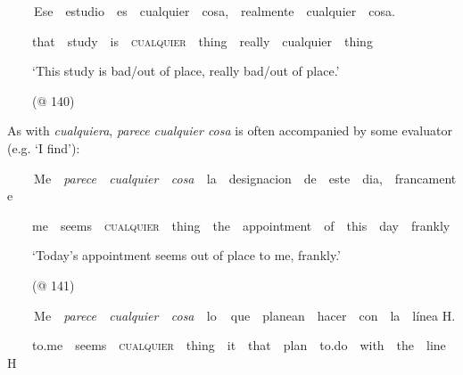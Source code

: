 \begin{styleStandard}
\textbf{\ \ }\ \ Ese\ \ estudio\ \ es\ \ cualquier\ \ cosa,\ \ realmente\ \ cualquier\ \ cosa.
\end{styleStandard}

\begin{styleStandard}
\ \ \ \ that\ \ study\ \ is\ \ \textsc{cualquier\ \ }thing\ \ really\ \ cualquier\ \ thing
\end{styleStandard}

\begin{styleStandard}
\ \ \ \ ‘This study is bad/out of place, really bad/out of place.’
\end{styleStandard}

\begin{styleStandard}
\ \ \ \ (@ 140)
\end{styleStandard}

\begin{styleStandard}
As with \textit{cualquiera}, \textit{parece cualquier cosa} is often accompanied by some evaluator (e.g. ‘I find’):
\end{styleStandard}

\begin{styleStandard}
\textbf{\ \ }\ \ Me\ \ \textit{parece\ \ cualquier\ \ cosa\ \ }la\ \ designacion\ \ de\ \ este\ \ dia,\ \ francamente
\end{styleStandard}

\begin{styleStandard}
\ \ \ \ me\ \ seems\ \ \textsc{cualquier}\ \ thing\ \ the\ \ appointment\ \ of\ \ this\ \ day\ \ frankly
\end{styleStandard}

\begin{styleStandard}
\ \ \ \ ‘Today’s appointment seems out of place to me, frankly.’
\end{styleStandard}

\begin{styleStandard}
\ \ \ \ (@ 141)
\end{styleStandard}

\begin{styleStandard}
\textbf{\ \ }\ \ Me\ \ \textit{parece\ \ cualquier\ \ cosa\ \ }lo\textbf{\ \ }que\ \ planean\ \ hacer\ \ con\ \ la\ \ línea H.
\end{styleStandard}

\begin{styleStandard}
\ \ \ \ to.me\ \ seems\ \ \textsc{cualquier}\ \ thing\ \ it\ \ that\ \ plan\ \ to.do\ \ with\ \ the\ \ line H
\end{styleStandard}

